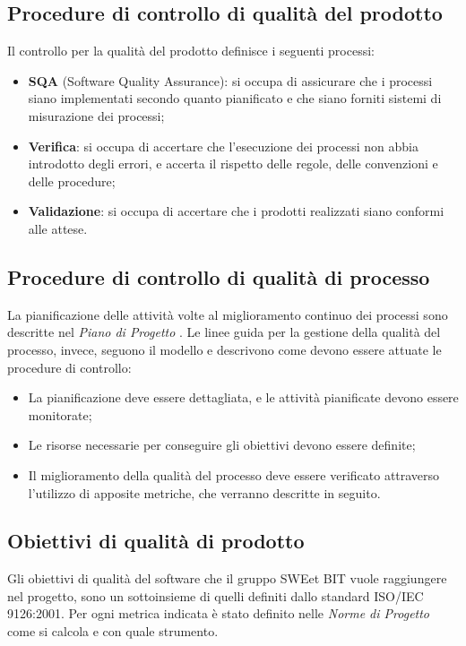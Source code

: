   \subsection{Procedure di controllo di qualità del prodotto}
    Il controllo per la qualità del prodotto definisce i seguenti processi:
    \begin{itemize}
      \item \textbf{SQA} (Software Quality Assurance): si occupa di assicurare
      che i processi siano implementati secondo quanto pianificato e che siano
      forniti sistemi di misurazione dei processi;
      \item \textbf{Verifica}: si occupa di accertare che l'esecuzione dei
      processi non abbia introdotto degli errori, e accerta il rispetto delle
      regole, delle convenzioni e delle procedure;
      \item \textbf{Validazione}: si occupa di accertare che i prodotti
      realizzati siano conformi alle attese.
    \end{itemize}

  \subsection{Procedure di controllo di qualità di processo}
  La pianificazione delle attività volte al miglioramento continuo dei processi
  sono descritte nel \emph{Piano di Progetto \VersionePP{}}. Le linee guida per
  la gestione della qualità del processo, invece, seguono il modello  e
  descrivono come devono essere attuate le procedure di controllo:
  \begin{itemize}
    \item La pianificazione deve essere dettagliata, e le attività pianificate
    devono essere monitorate;
    \item Le risorse necessarie per conseguire gli obiettivi devono essere
    definite;
    \item Il miglioramento della qualità del processo deve essere verificato
    attraverso l'utilizzo di apposite metriche, che verranno descritte in seguito.
  \end{itemize}
  
  
\subsection{Obiettivi di qualità di prodotto}  
Gli obiettivi di qualità del software che il gruppo SWEet BIT vuole raggiungere nel progetto, sono un sottoinsieme di quelli definiti dallo standard ISO/IEC 9126:2001.
Per ogni metrica indicata è stato definito nelle \emph{Norme di Progetto}\VersioneNP{} come si calcola e con quale strumento.

